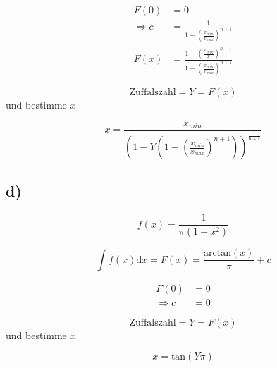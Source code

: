 \begin{align}
  F(0)&=0\\
  \Rightarrow c&=\frac{1}{1-\left(\frac{x_{min}}{x_{max}}\right)^{n+1}}  \\
  F(x)&=\frac{1- \left(\frac{x_{min}}{x}\right)^{n+1}}{1-\left(\frac{x_{min}}{x_{max}}\right)^{n+1}}
\end{align}

\begin{equation}
  \text{Zuffalszahl}=Y=F(x)
\end{equation}
und bestimme $x$

\begin{equation}
  x=\frac{x_{min}}{\left(1-Y\left(1-\left(\frac{x_{min}}{x_{max}}\right)^{n+1}\right)\right)^{\frac{1}{n+1}}}
\end{equation}

\subsection{d)}


\begin{equation}
  f(x)=\frac{1}{\pi(1+x^2)}
\end{equation}

\begin{equation}
  \int f(x)\text{d}x=F(x)=\frac{\text{arctan}(x)}{\pi}+c
\end{equation}


\begin{align}
  F(0)&=0\\
  \Rightarrow c&=0
\end{align}

\begin{equation}
  \text{Zuffalszahl}=Y=F(x)
\end{equation}
und bestimme $x$

\begin{equation}
  x=\text{tan}(Y\pi)
\end{equation}
